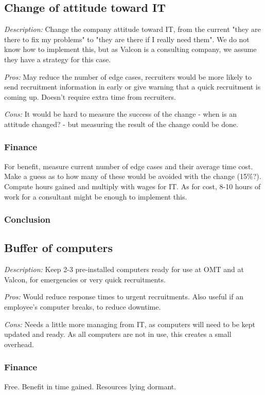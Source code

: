 \subsection{Change of attitude toward IT}
\emph{Description:} Change the company attitude toward IT, from the current "they are there to fix my problems" to "they are there if I really need them".
We do not know how to implement this, but as Valcon is a consulting company, we assume they have a strategy for this case.

\emph{Pros:} May reduce the number of edge cases, recruiters would be more likely to send recruitment information in early or give warning that a quick recruitment is coming up.
Doesn't require extra time from recruiters.

\emph{Cons:} It would be hard to measure the success of the change - when is an attitude changed? - but measuring the result of the change could be done.

\subsubsection{Finance} For benefit, measure current number of edge cases and their average time cost.
Make a guess as to how many of these would be avoided with the change (15\%?).
Compute hours gained and multiply with wages for IT.
As for cost, 8-10 hours of work for a consultant might be enough to implement this.

\subsubsection{Conclusion} 

\subsection{Buffer of computers}
\emph{Description:} Keep 2-3 pre-installed computers ready for use at OMT and at Valcon, for emergencies or very quick recruitments.

\emph{Pros:} Would reduce response times to urgent recruitments.
Also useful if an employee's computer breaks, to reduce downtime.

\emph{Cons:} Needs a little more managing from IT, as
computers will need to be kept updated and ready.
As all computers are not in use, this creates a small overhead.

\subsubsection{Finance} Free. Benefit in time gained. Resources lying dormant.

